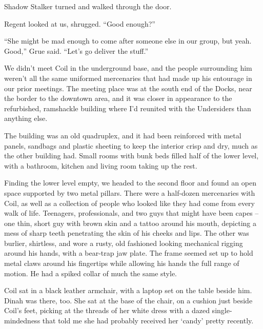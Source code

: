 Shadow Stalker turned and walked through the door.



Regent looked at us, shrugged.  ``Good enough?''



``She might be mad enough to come after someone else in our group, but yeah.  Good,'' Grue said.  ``Let's go deliver the stuff.''



\blacksquare



We didn't meet Coil in the underground base, and the people surrounding him weren't all the same uniformed mercenaries that had made up his entourage in our prior meetings.  The meeting place was at the south end of the Docks, near the border to the downtown area, and it was closer in appearance to the refurbished, ramshackle building where I'd reunited with the Undersiders than anything else.



The building was an old quadruplex, and it had been reinforced with metal panels, sandbags and plastic sheeting to keep the interior crisp and dry, much as the other building had.  Small rooms with bunk beds filled half of the lower level, with a bathroom, kitchen and living room taking up the rest.



Finding the lower level empty, we headed to the second floor and found an open space supported by two metal pillars.  There were a half-dozen mercenaries with Coil, as well as a collection of people who looked like they had come from every walk of life.  Teenagers, professionals, and two guys that might have been capes – one thin, short guy with brown skin and a tattoo around his mouth, depicting a mess of sharp teeth penetrating the skin of his cheeks and lips.  The other was burlier, shirtless, and wore a rusty, old fashioned looking mechanical rigging around his hands, with a bear-trap jaw plate.  The frame seemed set up to hold metal claws around his fingertips while allowing his hands the full range of motion.   He had a spiked collar of much the same style.



Coil sat in a black leather armchair, with a laptop set on the table beside him.  Dinah was there, too.  She sat at the base of the chair, on a cushion just beside Coil's feet, picking at the threads of her white dress with a dazed single-mindedness that told me she had probably received her `candy' pretty recently.




